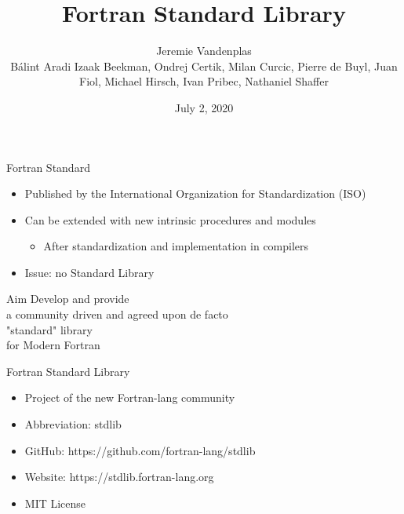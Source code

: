 \documentclass{beamer}
\title{Fortran Standard Library}
\author[]{Jeremie Vandenplas\\[3mm]
Bálint Aradi
Izaak Beekman,
Ondrej Certik,
Milan Curcic,
Pierre de Buyl,
Juan Fiol,
Michael Hirsch,
Ivan Pribec,
Nathaniel Shaffer}
\date{July 2, 2020}
\begin{document}
\begin{frame}[t]
	\titlepage
\end{frame}	

\begin{frame}[c]{Fortran Standard}
	\begin{itemize}
		\item Published by the International Organization for Standardization (ISO)
		\item Can be extended with new intrinsic procedures and modules
		\begin{itemize}
			\item After standardization and implementation in compilers
		\end{itemize}
		\item Issue: no Standard Library
	\end{itemize}
\end{frame}


\begin{frame}[c]{Aim}
	\center
	Develop and provide\\
	a community driven and agreed upon de facto\\
	"standard" library \\
	for Modern Fortran
\end{frame}


\begin{frame}[c]{Fortran Standard Library}
	\begin{itemize}
		\item Project of the new Fortran-lang community
		\item Abbreviation: stdlib
		\item GitHub: https://github.com/fortran-lang/stdlib
		\item Website: https://stdlib.fortran-lang.org
		\item MIT License
	\end{itemize}
\end{frame}
\end{document}

